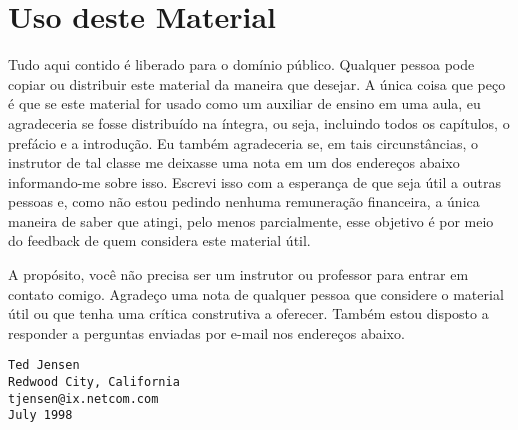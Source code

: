 \section*{Uso deste Material}
Tudo aqui contido é liberado para o domínio público. Qualquer pessoa pode copiar ou distribuir este material da maneira que desejar. A única coisa que peço é que se este material for usado como um auxiliar de ensino em uma aula, eu agradeceria se fosse distribuído na íntegra, ou seja, incluindo todos os capítulos, o prefácio e a introdução. Eu também agradeceria se, em tais circunstâncias, o instrutor de tal classe me deixasse uma nota em um dos endereços abaixo informando-me sobre isso. Escrevi isso com a esperança de que seja útil a outras pessoas e, como não estou pedindo nenhuma remuneração financeira, a única maneira de saber que atingi, pelo menos parcialmente, esse objetivo é por meio do feedback de quem considera este material útil.

A propósito, você não precisa ser um instrutor ou professor para entrar em contato comigo. Agradeço uma nota de qualquer pessoa que considere o material útil ou que tenha uma crítica construtiva a oferecer. Também estou disposto a responder a perguntas enviadas por e-mail nos endereços abaixo.

\begin{verbatim}
Ted Jensen
Redwood City, California
tjensen@ix.netcom.com
July 1998
\end{verbatim}